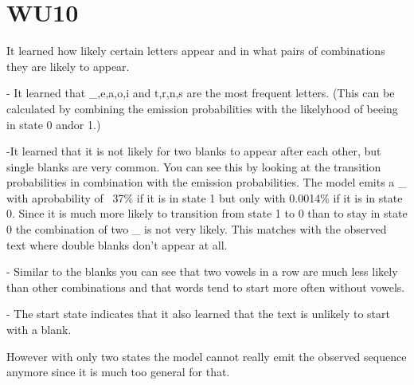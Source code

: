 \section*{WU10}
It learned how likely certain letters appear and in what pairs of combinations they are likely to appear.

- It learned that \_,e,a,o,i and t,r,n,s are the most frequent letters. (This can be calculated by combining the emission probabilities
with the likelyhood of beeing in state 0 and\/or 1.)

-It learned that it is not likely for two blanks to appear after each other, but single blanks are very common.
You can see this by looking at the transition probabilities in combination with the emission probabilities. The model
emits a \_ with aprobability of ~37\% if it is in state 1 but only with 0.0014\% if it is in state 0. Since it is much more likely to transition from
state 1 to 0 than to stay in state 0 the combination of two \_ is not very likely. This matches with the observed text where double blanks don't appear at all.

- Similar to the blanks you can see that two vowels in a row are much less likely than other combinations and that words tend to start more often without vowels.

- The start state indicates that it also learned that the text is unlikely to start with a blank.

However with only two states the model cannot really emit the observed sequence anymore since it is much too general for that.

